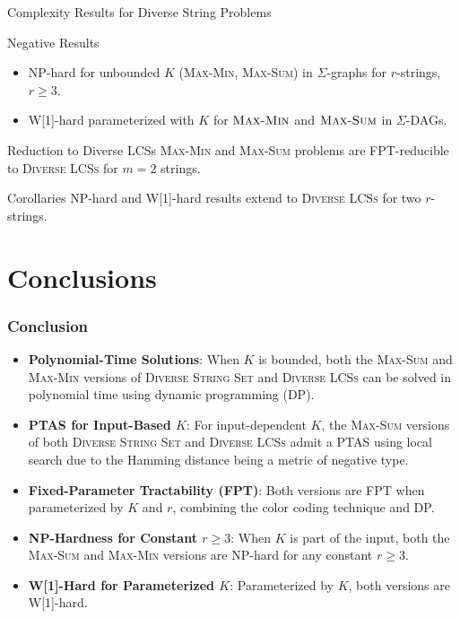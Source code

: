 \documentclass{beamer}
\begin{document}
\begin{frame}{Complexity Results for Diverse String Problems}
    \begin{block}{Negative Results}
        \begin{itemize}
            \item NP-hard for unbounded $K$ (\textsc{Max-Min}, \textsc{Max-Sum}) in $\Sigma$-graphs for $r$-strings, $r \ge 3$.
            \item W[1]-hard parameterized with $K$ for $\textsc{Max-Min}$ and $\textsc{Max-Sum}$ in $\Sigma$-DAGs.
        \end{itemize}
    \end{block}

    \begin{block}{Reduction to Diverse LCSs}
        \textsc{Max-Min} and \textsc{Max-Sum} problems are FPT-reducible to \textsc{Diverse LCSs} for $m=2$ strings.
    \end{block}

    \begin{block}{Corollaries}
        NP-hard and W[1]-hard results extend to \textsc{Diverse LCSs} for two $r$-strings.
    \end{block}
\end{frame}

\section*{Conclusions}
\begin{frame}
    \frametitle{Conclusion}

    \begin{itemize}
        \item \textbf{Polynomial-Time Solutions}: When \( K \) is bounded, both the \textsc{Max-Sum} and \textsc{Max-Min} versions of \textsc{Diverse String Set} and \textsc{Diverse LCSs} can be solved in polynomial time using dynamic programming (DP).
        \item \textbf{PTAS for Input-Based \( K \)}: For input-dependent \( K \), the \textsc{Max-Sum} versions of both \textsc{Diverse String Set} and \textsc{Diverse LCSs} admit a PTAS using local search due to the Hamming distance being a metric of negative type.
        \item \textbf{Fixed-Parameter Tractability (FPT)}: Both versions are FPT when parameterized by \( K \) and \( r \), combining the color coding technique and DP.
        \item \textbf{NP-Hardness for Constant \( r \ge 3 \)}: When \( K \) is part of the input, both the \textsc{Max-Sum} and \textsc{Max-Min} versions are NP-hard for any constant \( r \ge 3 \).
        \item \textbf{W[1]-Hard for Parameterized \( K \)}: Parameterized by \( K \), both versions are W[1]-hard.
    \end{itemize}

\end{frame}
\end{document}

